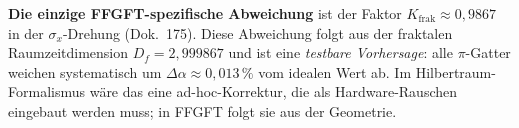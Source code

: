 \begin{center}
\renewcommand{\arraystretch}{1.4}
{\small
{}
}
\renewcommand{\arraystretch}{1.0}
\end{center}

\textbf{Die einzige FFGFT-spezifische Abweichung} ist der Faktor
$K_{\text{frak}} \approx 0{,}9867$ in der $\sigma_x$-Drehung
(Dok.~175). Diese Abweichung folgt aus der fraktalen Raumzeitdimension
$D_f = 2{,}999867$ und ist eine \emph{testbare Vorhersage}: alle
$\pi$-Gatter weichen systematisch um $\Delta\alpha \approx 0{,}013\,\%$
vom idealen Wert ab. Im Hilbertraum-Formalismus wäre das eine
ad-hoc-Korrektur, die als Hardware-Rauschen eingebaut werden muss;
in FFGFT folgt sie aus der Geometrie.

